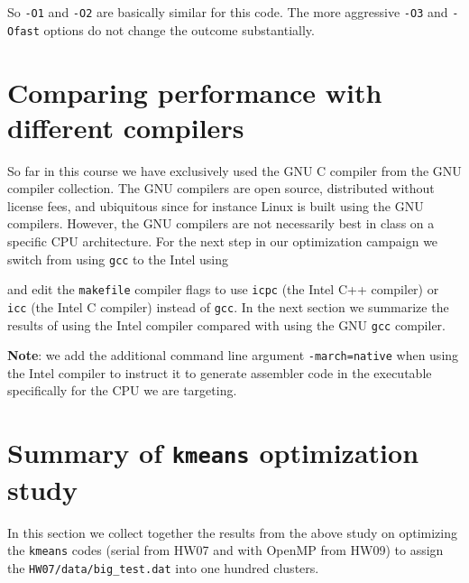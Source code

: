 So \texttt{-O1} and \texttt{-O2} are basically similar for this code. The more aggressive \texttt{-O3} and \texttt{-Ofast} options do not change the outcome substantially.  

\section{Comparing performance with different compilers}

So far in this course we have exclusively used the GNU C compiler from the GNU compiler collection. The GNU compilers are open source, distributed without license fees, and ubiquitous since for instance Linux is built using the GNU compilers. However, the GNU compilers are not necessarily best in class on a specific CPU architecture. For the next step in our optimization campaign we switch from using \texttt{gcc} to the Intel using 


and edit the \texttt{makefile} compiler flags to use \texttt{icpc} (the Intel C++ compiler) or \texttt{icc} (the Intel C compiler) instead of \texttt{gcc}.
In the next section we summarize the results of using the Intel compiler compared with using the GNU \texttt{gcc} compiler. 

{\bf Note}: we add the  additional command line argument \texttt{-march=native} when using the Intel compiler to instruct it to generate assembler code in the executable specifically for the CPU we are targeting. 

\section{Summary of \texttt{kmeans} optimization study}

In this section we collect together the results from the above study on optimizing the \texttt{kmeans} codes (serial from HW07 and with OpenMP from HW09) to assign the \texttt{HW07/data/big\_test.dat} into one hundred clusters. 

